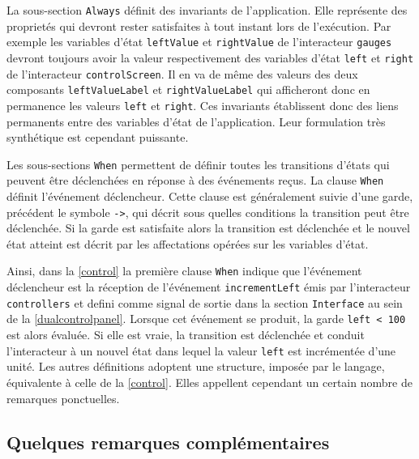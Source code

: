 \documentclass{ihm}
\begin{document}
La   sous-section  \lstinline$Always$   définit   des  invariants   de
l'application.   Elle représente  des  proprietés  qui devront  rester
satisfaites  à  tout instant  lors  de  l'exécution. Par  exemple  les
variables  d'état \lstinline$leftValue$  et \lstinline$rightValue$  de
l'interacteur  \lstinline$gauges$  devront  toujours avoir  la  valeur
respectivement    des    variables    d'état    \lstinline$left$    et
\lstinline$right$ de l'interacteur \lstinline$controlScreen$. Il en va
de même des valeurs  des deux composants \lstinline$leftValueLabel$ et
\lstinline$rightValueLabel$  qui afficheront  donc  en permanence  les
valeurs   \lstinline$left$  et   \lstinline$right$.   Ces   invariants
établissent donc  des liens permanents  entre des variables  d'état de
l'application.   Leur  formulation   très  synthétique  est  cependant
puissante.

Les sous-sections  \lstinline$When$ permettent  de définir  toutes les
transitions  d'états qui  peuvent être  déclenchées en  réponse à  des
événements  reçus.   La  clause \lstinline$When$  définit  l'événement
déclencheur.  Cette  clause  est   généralement  suivie  d'une  garde,
précédent  le   symbole  \lstinline$->$,   qui  décrit   sous  quelles
conditions  la  transition peut  être  déclenchée.   Si la  garde  est
satisfaite  alors  la transition  est  déclenchée  et le  nouvel  état
atteint  est décrit  par les  affectations opérées  sur les  variables
d'état.

Ainsi, dans  la \autoref{control} la première  clause \lstinline$When$
indique que  l'événement déclencheur  est la réception  de l'événement
\lstinline$incrementLeft$        émis         par        l'interacteur
\lstinline$controllers$  et  defini comme  signal  de  sortie dans  la
section      \lstinline$Interface$       au      sein       de      la
\autoref{dualcontrolpanel}. Lorsque cet événement se produit, la garde
\lstinline$left < 100$  est  alors  évaluée. Si  elle  est vraie,  la
transition est  déclenchée et conduit  l'interacteur à un  nouvel état
dans lequel  la valeur  \lstinline$left$ est incrémentée  d'une unité.
Les autres définitions adoptent une structure, imposée par le langage,
équivalente à celle de la \autoref{control}. Elles appellent cependant
un certain nombre de remarques ponctuelles.


\subsection{Quelques remarques complémentaires}
\label{sec:remarques}
\end{document}
